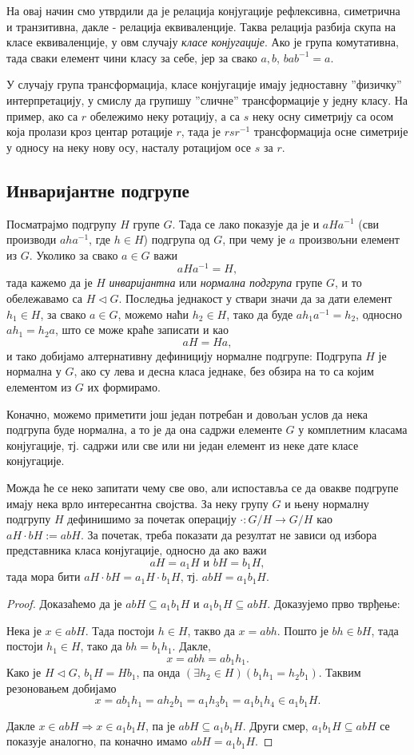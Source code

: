 \documentclass{report}
\theoremstyle{plain}
\theoremstyle{definition}
\begin{document}
На овај начин смо утврдили да је релација конјугације рефлексивна, симетрична и транзитивна, дакле - релација еквиваленције. Таква релација разбија скупа на класе еквиваленције, у овм случају \emph{класе конјугације}. Ако је група комутативна, тада сваки елемент чини класу за себе, јер за свако $a, b$, $bab^{-1} = a$.

У случају група трансформација, класе конјугације имају једноставну ''физичку'' интерпретацију, у смислу да групишу ''сличне'' трансформације у једну класу. На пример, ако са $r$ обележимо неку ротацију, а са $s$ неку осну симетрију са осом која пролази кроз центар ротације $r$, тада је $r s r^{-1}$ трансформација осне симетрије у односу на неку нову осу, насталу ротацијом осе $s$ за $r$.

\subsection{Инваријантне подгрупе}
Посматрајмо подгрупу $H$ групе $G$. Тада се лако показује да је и $aHa^{-1}$ (сви производи $aha^{-1}$, где $h\in H$) подгрупа од $G$, при чему је $a$ произвољни елемент из $G$. Уколико за свако $a\in G$ важи
$$aHa^{-1} = H,$$
тада кажемо да је $H$ \emph{инваријантна} или \emph{нормална подгрупа} групе $G$, и то обележавамо са $H\lhd G$. Последња једнакост у ствари значи да за дати елемент $h_1\in H$, за свако $a\in G$, можемо наћи $h_2\in H$, тако да буде $ah_1a^{-1} = h_2$, односно $ah_1 = h_2 a$, што се може краће записати и као
$$aH = Ha, $$
и тако добијамо алтернативну дефиницију нормалне подгрупе: Подгрупа $H$ је нормална у $G$, ако су лева и десна класа једнаке, без обзира на то са којим елементом из $G$ их формирамо.

Коначно, можемо приметити још један потребан и довољан услов да нека подгрупа буде нормална, а то је да она садржи елементе $G$ у комплетним класама конјугације, тј. садржи или све или ни један елемент из неке дате класе конјугације.

Можда ће се неко запитати чему све ово, али испоставља се да овакве подгрупе имају нека врло интересантна својства. За неку групу $G$ и њену нормалну подгрупу $H$ дефинишимо за почетак операцију $\cdot: G/H \to G/H$ као $aH\cdot bH := abH$. За почетак, треба показати да резултат не зависи од избора представника класа конјугације, односно да ако важи
$$aH = a_1 H \text{ и } bH = b_1 H,$$
тада мора бити $aH\cdot bH = a_1 H \cdot b_1 H$, тј. $abH = a_1 b_1 H$.

\begin{proof}
Доказаћемо да је $abH \subseteq a_1 b_1 H$ и $a_1 b_1 H \subseteq abH$. Доказујемо прво тврђење:

Нека је $x\in abH$. Тада постоји $h\in H$, такво да $x=abh$. Пошто је $bh\in bH$, тада постоји $h_1\in H$, тако да $bh = b_1 h_1$. Дакле,
$$x = abh = ab_1 h_1.$$
Како је $H\lhd G$, $b_1 H = Hb_1$, па онда $(\exists h_2\in H)(b_1h_1=h_2b_1)$. Таквим резоновањем добијамо
$$x = ab_1h_1 = ah_2b_1 = a_1h_3b_1 = a_1b_1h_4 \in a_1b_1H.$$

Дакле $x\in abH \Rightarrow x\in a_1b_1H$, па  је $abH \subseteq a_1b_1H$. Други смер, $a_1 b_1 H \subseteq abH$ се показује аналогно, па коначно имамо $abH = a_1b_1H$.
\end{proof}
\end{document}
